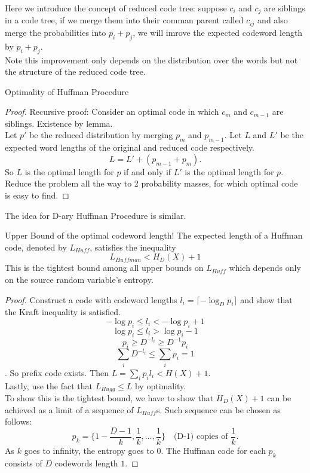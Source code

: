 \documentclass[../main.tex]{subfiles}
\begin{document}
Here we introduce the concept of reduced code tree: suppose $c_i$ and $c_j$ are siblings in a code tree, if we merge them into their comman parent called $c_{ij}$ and also merge the probabilities into $p_i+p_j$, we will imrove the expected codeword length by $p_i+p_j$.\\
Note this improvement only depends on the distribution over the words but not the structure of the reduced code tree.
\begin{bbox}{Optimality of Huffman Procedure}
\begin{proof}
    Recursive proof: Consider an optimal code in which $c_m$ and $c_{m-1}$ are siblings. Existence by lemma.\\
    Let $p'$ be the reduced distribution by merging $p_m$ and $p_{m-1}$. Let $L$ and $L'$ be the expected word lengths of the original and reduced code respectively.\\
    \[
    L = L' + (p_{m-1} + p_m).
    \]
    So $L$ is the optimal length for $p$ if and only if $L'$ is the optimal length for $p.$\\
    Reduce the problem all the way to 2 probability masses, for which optimal code is easy to find. 
\end{proof}
\end{bbox}
The idea for D-ary Huffman Procedure is similar.
\begin{bbox}{Upper Bound of the optimal codeword length!}
    The expected length of a Huffman code, denoted by $L_{Huff}$, satisfies the inequality \[
    L_{Huffman} < H_D(X)+1
    \]
    This is the tightest bound among all upper bounds on $L_{Huff}$ which depends only on the source random variable's entropy.
    \begin{proof}
        Construct a code with codeword lengths $l_i=\lceil -\log_{D}p_i\rceil$ and show that the Kraft inequality is satisfied. \[
        -\log p_i \leq l_i < -\log p_i + 1
        \]\[
        \log p_i \leq l_i > \log p_i - 1
        \]\[
        p_i \geq D^{-l_i} \geq D^{-1}p_i
        \]
        \[
        \sum_i D^{-l_i} \leq \sum_{i}p_i = 1
        \]. So prefix code exists.
        Then $L=\sum_i p_i l_i < H(X)+1$.\\
        Lastly, use the fact that $L_{Hugg}\leq L$ by optimality.\\
        To show this is the tightest bound, we have to show that $H_D(X)+1$ can be achieved as a limit of a sequence of $L_{Huff}$s. 
        Such sequence can be chosen as follows: \[
        p_k=\{1-\frac{D-1}{k},\frac{1}{k},\dots,\frac{1}{k}\} \quad\text{(D-1) copies of $\frac{1}{k}$}.
        \] As $k$ goes to infinity, the entropy goes to $0$. The Huffman code for each $p_k$ consists of $D$ codewords length $1$.
    \end{proof}
\end{bbox}
\end{document}
